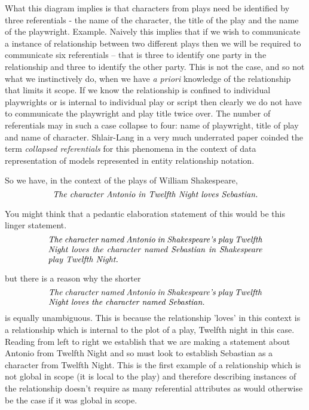 \mynote What this diagram implies is that characters from plays need be identified by three referentials - the name of the character, the title of the play and the name of the playwright.
Example.
\mynote Naively this implies that if we wish to communicate a instance of relationship between two different plays then we will be required to communicate six referentials -- that is three to identify one party in the relationship and three to identify the other party. This is not the case, and so not what we instinctively do, when we have \textit{a priori} knowledge of the relationship that limits it scope. If we know the relationship is confined to individual playwrights or is internal to individual play or script then clearly we do not have to communicate the playwright and play title twice over. The number of referentials may in such a case collapse to four: name of playwright, title of play and name of character.
Shlair-Lang in a very much underrated paper coinded the term \textit{collapsed referentials} for this phenomena in the context of data representation of models represented in entity relationship notation.

\mynote 
So we have, in the context of the plays of William Shakespeare,
\begin{equation}
\mbox{\textit{The character Antonio in Twelfth Night loves Sebastian.}}
\end{equation} 

You might think that a pedantic elaboration statement of this would be this linger statement.
\begin{equation}
\text{\parbox{9cm}{\textit{The character named Antonio in Shakespeare's play Twelfth Night loves the character named Sebastian in Shakespeare play Twelfth Night.}}}
\end{equation} 

but there is a reason why the shorter
\begin{equation}
\text{\parbox{9cm}{\textit{The character named Antonio in Shakespeare's play Twelfth Night loves the character named Sebastian.}}}
\end{equation} 
is equally unambiguous. This is because the relationship 'loves' in this context is a relationship which is internal to the plot of a play, Twelfth night in this case.
Reading from left to right we establish that we are making a statement about 
Antonio from Twelfth Night  and so must look to establish Sebastian as a character from Twelfth Night. This is the first example of a relationship which is not global in scope (it is local to the play) and therefore describing instances of the relationship doesn't require as many referential attributes as would otherwise be the case if it was global in scope.

